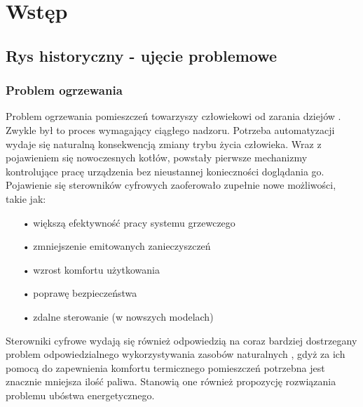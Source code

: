 \documentclass[11pt]{report}
\begin{document}
 \begin{titlepage}
 \vspace{0.1\textheight}
 \bigskip
 \vspace{0.3\textheight}
 \par

 \vspace{0.1\textheight}
 \end{titlepage}


 \tableofcontents


 \chapter{Wstęp}
 
 \section{Rys historyczny - ujęcie problemowe}
 \subsection{Problem ogrzewania}
 Problem ogrzewania pomieszczeń towarzyszy człowiekowi od zarania dziejów \cite{Hoppe2018}. Zwykle był to proces wymagający ciągłego nadzoru. Potrzeba automatyzacji wydaje się naturalną konsekwencją zmiany trybu życia człowieka. Wraz z pojawieniem się nowoczesnych kotłów, powstały pierwsze mechanizmy kontrolujące pracę urządzenia bez nieustannej konieczności doglądania go.
 Pojawienie się sterowników cyfrowych zaoferowało zupełnie nowe możliwości, takie jak:
  \begin{enumerate}
 \item[•] większą efektywność pracy systemu grzewczego
 \item[•] zmniejszenie emitowanych zanieczyszczeń
 \item[•] wzrost komfortu użytkowania
 \item[•] poprawę bezpieczeństwa
 \item[•] zdalne sterowanie (w nowszych modelach)
  \end{enumerate}
 Sterowniki cyfrowe wydają się również odpowiedzią na coraz bardziej dostrzegany problem odpowiedzialnego wykorzystywania zasobów naturalnych \cite{Mazurek2018}\cite{Mazurek2018a}, gdyż za ich pomocą do zapewnienia komfortu termicznego pomieszczeń potrzebna jest znacznie mniejsza ilość paliwa. Stanowią one również propozycję rozwiązania problemu ubóstwa energetycznego.
\end{document}
